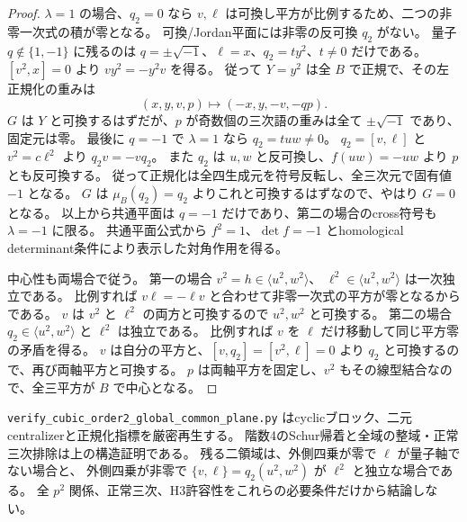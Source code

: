 \begin{proof}
$\lambda=1$ の場合、$q_2=0$ なら $v,\ell$ は可換し平方が比例するため、二つの非零一次式の積が零となる。
可換/Jordan平面には非零の反可換 $q_2$ がない。
量子 $q\notin\{1,-1\}$ に残るのは $q=\pm\sqrt{-1}$、$\ell=x$、$q_2=t y^2$、$t\ne0$ だけである。
$[v^2,x]=0$ より $vy^2=-y^2v$ を得る。
従って $Y=y^2$ は全 $B$ で正規で、その左正規化の重みは
\[
 (x,y,v,p)\longmapsto(-x,y,-v,-qp).
\]
$G$ は $Y$ と可換するはずだが、$p$ が奇数個の三次語の重みは全て $\pm\sqrt{-1}$ であり、固定元は零。
最後に $q=-1$ で $\lambda=1$ なら $q_2=tuw\ne0$。
$q_2=[v,\ell]$ と $v^2=c\ell^2$ より $q_2v=-vq_2$。
また $q_2$ は $u,w$ と反可換し、$f(uw)=-uw$ より $p$ とも反可換する。
従って正規化は全四生成元を符号反転し、全三次元で固有値 $-1$ となる。
$G$ は $\mu_B(q_2)=q_2$ よりこれと可換するはずなので、やはり $G=0$ となる。
以上から共通平面は $q=-1$ だけであり、第二の場合のcross符号も $\lambda=-1$ に限る。
共通平面公式から $f^2=1$、$\det f=-1$ とhomological determinant条件により表示した対角作用を得る。

中心性も両場合で従う。
第一の場合 $v^2=h\in\langle u^2,w^2\rangle$、
$\ell^2\in\langle u^2,w^2\rangle$ は一次独立である。
比例すれば $v\ell=-\ell v$ と合わせて非零一次式の平方が零となるからである。
$v$ は $v^2$ と $\ell^2$ の両方と可換するので $u^2,w^2$ と可換する。
第二の場合 $q_2\in\langle u^2,w^2\rangle$ と $\ell^2$ は独立である。
比例すれば $v$ を $\ell$ だけ移動して同じ平方零の矛盾を得る。
$v$ は自分の平方と、$[v,q_2]=[v^2,\ell]=0$ より $q_2$ と可換するので、再び両軸平方と可換する。
$p$ は両軸平方を固定し、$v^2$ もその線型結合なので、全三平方が $B$ で中心となる。
\end{proof}
\texttt{verify\_\allowbreak{}cubic\_\allowbreak{}order2\_\allowbreak{}global\_\allowbreak{}common\_\allowbreak{}plane.py}
はcyclicブロック、二元centralizerと正規化指標を厳密再生する。
階数4のSchur帰着と全域の整域・正常三次排除は上の構造証明である。
残る二領域は、外側四乗が零で $\ell$ が量子軸でない場合と、
外側四乗が非零で $\{v,\ell\}=q_2(u^2,w^2)$ が $\ell^2$ と独立な場合である。
全 $p^2$ 関係、正常三次、H3許容性をこれらの必要条件だけから結論しない。

